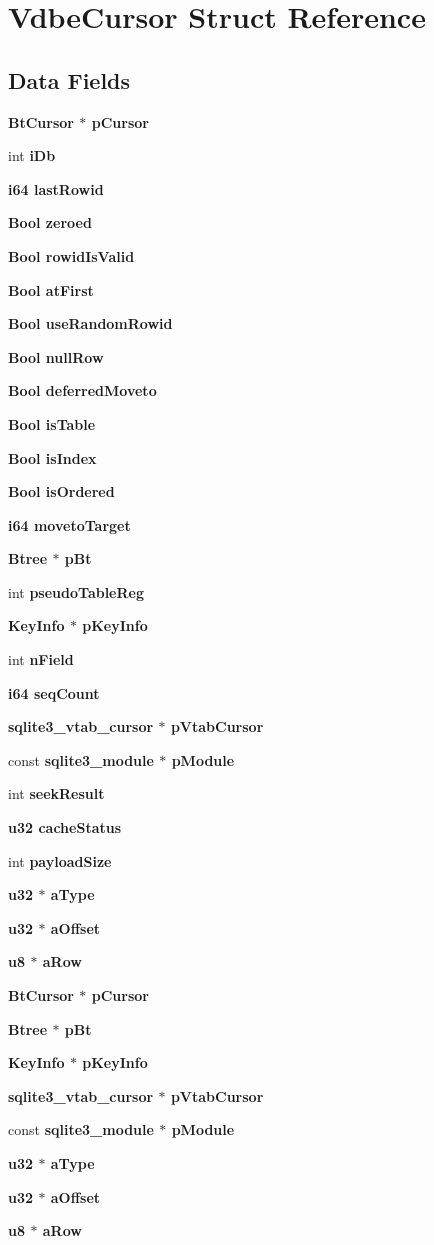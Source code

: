 \section{Vdbe\-Cursor Struct Reference}
\label{structVdbeCursor}
\subsection*{Data Fields}
\begin{CompactItemize}
\item 
\bf{Bt\-Cursor} $\ast$ \bf{p\-Cursor}
\item 
int \bf{i\-Db}
\item 
\bf{i64} \bf{last\-Rowid}
\item 
\bf{Bool} \bf{zeroed}
\item 
\bf{Bool} \bf{rowid\-Is\-Valid}
\item 
\bf{Bool} \bf{at\-First}
\item 
\bf{Bool} \bf{use\-Random\-Rowid}
\item 
\bf{Bool} \bf{null\-Row}
\item 
\bf{Bool} \bf{deferred\-Moveto}
\item 
\bf{Bool} \bf{is\-Table}
\item 
\bf{Bool} \bf{is\-Index}
\item 
\bf{Bool} \bf{is\-Ordered}
\item 
\bf{i64} \bf{moveto\-Target}
\item 
\bf{Btree} $\ast$ \bf{p\-Bt}
\item 
int \bf{pseudo\-Table\-Reg}
\item 
\bf{Key\-Info} $\ast$ \bf{p\-Key\-Info}
\item 
int \bf{n\-Field}
\item 
\bf{i64} \bf{seq\-Count}
\item 
\bf{sqlite3\_\-vtab\_\-cursor} $\ast$ \bf{p\-Vtab\-Cursor}
\item 
const \bf{sqlite3\_\-module} $\ast$ \bf{p\-Module}
\item 
int \bf{seek\-Result}
\item 
\bf{u32} \bf{cache\-Status}
\item 
int \bf{payload\-Size}
\item 
\bf{u32} $\ast$ \bf{a\-Type}
\item 
\bf{u32} $\ast$ \bf{a\-Offset}
\item 
\bf{u8} $\ast$ \bf{a\-Row}
\item 
\bf{Bt\-Cursor} $\ast$ \bf{p\-Cursor}
\item 
\bf{Btree} $\ast$ \bf{p\-Bt}
\item 
\bf{Key\-Info} $\ast$ \bf{p\-Key\-Info}
\item 
\bf{sqlite3\_\-vtab\_\-cursor} $\ast$ \bf{p\-Vtab\-Cursor}
\item 
const \bf{sqlite3\_\-module} $\ast$ \bf{p\-Module}
\item 
\bf{u32} $\ast$ \bf{a\-Type}
\item 
\bf{u32} $\ast$ \bf{a\-Offset}
\item 
\bf{u8} $\ast$ \bf{a\-Row}
\end{CompactItemize}



